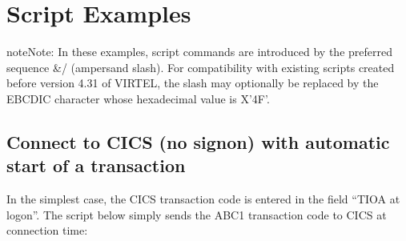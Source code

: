 \documentclass[letterpaper,10pt,english]{sphinxmanual}
\begin{document}
\ignorespaces 

\section{Script Examples}
\label{\detokenize{connectivity_guide:script-examples}}\label{\detokenize{connectivity_guide:index-122}}
\begin{sphinxadmonition}{note}{Note:}
\sphinxAtStartPar
In these examples, script commands are introduced by the preferred sequence \&/ (ampersand slash). For compatibility with existing scripts created before version 4.31 of VIRTEL, the slash may optionally be replaced by the EBCDIC character whose hexadecimal value is X’4F’.
\end{sphinxadmonition}

\ignorespaces 

\subsection{Connect to CICS (no sign\sphinxhyphen{}on) with automatic start of a transaction}
\label{\detokenize{connectivity_guide:connect-to-cics-no-sign-on-with-automatic-start-of-a-transaction}}\label{\detokenize{connectivity_guide:index-123}}
\sphinxAtStartPar
In the simplest case, the CICS transaction code is entered in the field “TIOA at logon”. The script below simply sends the ABC1 transaction code to CICS at connection time:
\end{document}
